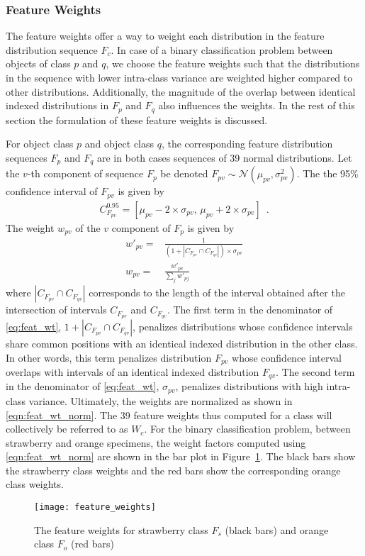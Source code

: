 \subsubsection{Feature Weights}
\label{sec:distdes_feat_wts}

The feature weights offer a way to weight each distribution in the feature distribution sequence $F_c$. In case of a binary classification problem between objects of class $p$ and $q$, we choose the feature weights such that the distributions in the sequence with lower intra-class variance are weighted higher compared to other distributions. Additionally, the magnitude of the overlap between identical indexed distributions in $F_p$ and $F_q$ also influences the weights. In the rest of this section the formulation of these feature weights is discussed.

For object class $p$ and object class $q$, the corresponding feature distribution sequences $F_p$ and $F_q$ are in both cases sequences of 39 normal distributions. Let the $v$-th component of sequence $F_p$ be denoted $F_{pv}\sim\mathcal{N}(\mu_{pv},\sigma^2_{pv})$.
The the 95\% confidence interval of $F_{pv}$ is given by
%
\begin{align}	\label{eqn:conf_interval}
C^{0.95}_{F_{pv}}=[\mu_{pv}-2 \times \sigma_{pv},\, \mu_{pv}+2 \times \sigma_{pv}]\enspace .
\end{align}
%
The weight $w_{pv}$ of the $v$ component of $F_p$ is given by
\begin{align}
 w'_{pv}= & \frac{1}{(1+ |C_{F_{pv}} \cap C_{F_{qv}}| )\times \sigma_{pv}} \label{eq:feat_wt}\\
 w_{pv}= & \frac{w'_{pv}}{\sum_{j} w'_{pj}} \label{eqn:feat_wt_norm}
\end{align}
where $|C_{F_{pv}} \cap C_{F_{qv}}|$ corresponds to the length of the interval obtained after the intersection of intervals $C_{F_{pv}}$ and $C_{F_{qv}}$. The first term in the denominator of \eqref{eq:feat_wt}, $1+ |C_{F_{pv}} \cap C_{F_{qv}}|$, penalizes distributions whose confidence intervals share common positions with an identical indexed distribution in the other class. In other words, this term penalizes distribution $F_{pv}$ whose confidence interval overlaps with intervals of an identical indexed distribution $F_{qv}$. The second term in the denominator of \eqref{eq:feat_wt}, $\sigma_{pv}$, penalizes distributions with high intra-class variance. Ultimately, the weights are normalized as shown in \eqref{eqn:feat_wt_norm}. The 39 feature weights thus computed for a class will collectively be referred to as $W_c$. For the binary classification problem, between strawberry and orange specimens, the weight factors computed using \eqref{eqn:feat_wt_norm} are shown in the bar plot in Figure~\ref{fig:feat_weights}. The black bars show the strawberry 
class 
weights and the red 
bars show the corresponding orange class weights.
%
\begin{figure}
  \centering
  \texttt{[image: feature\_weights]}
  \caption[Feature weights]{The feature weights for strawberry class $F_s$ (black bars) and orange class $F_o$ (red bars)}
  \label{fig:feat_weights}
\end{figure}	
%

